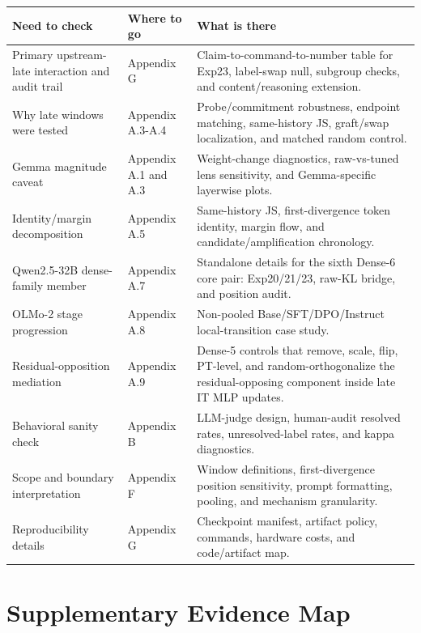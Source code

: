 \documentclass[11pt]{article}
\begin{document}
\begin{table}[t]
\centering
\small
\setlength{\tabcolsep}{3pt}
\begin{tabularx}{\linewidth}{@{}>{\raggedright\arraybackslash}X >{\raggedright\arraybackslash}X >{\raggedright\arraybackslash}X@{}}
\toprule
Need to check & Where to go & What is there \\
\midrule
Primary upstream-late interaction and audit trail & Appendix G & Claim-to-command-to-number table for Exp23, label-swap null, subgroup checks, and content/reasoning extension. \\
Why late windows were tested & Appendix A.3-A.4 & Probe/commitment robustness, endpoint matching, same-history JS, graft/swap localization, and matched random control. \\
Gemma magnitude caveat & Appendix A.1 and A.3 & Weight-change diagnostics, raw-vs-tuned lens sensitivity, and Gemma-specific layerwise plots. \\
Identity/margin decomposition & Appendix A.5 & Same-history JS, first-divergence token identity, margin flow, and candidate/amplification chronology. \\
Qwen2.5-32B dense-family member & Appendix A.7 & Standalone details for the sixth Dense-6 core pair: Exp20/21/23, raw-KL bridge, and position audit. \\
OLMo-2 stage progression & Appendix A.8 & Non-pooled Base/SFT/DPO/Instruct local-transition case study. \\
Residual-opposition mediation & Appendix A.9 & Dense-5 controls that remove, scale, flip, PT-level, and random-orthogonalize the residual-opposing component inside late IT MLP updates. \\
Behavioral sanity check & Appendix B & LLM-judge design, human-audit resolved rates, unresolved-label rates, and kappa diagnostics. \\
Scope and boundary interpretation & Appendix F & Window definitions, first-divergence position sensitivity, prompt formatting, pooling, and mechanism granularity. \\
Reproducibility details & Appendix G & Checkpoint manifest, artifact policy, commands, hardware costs, and code/artifact map. \\
\bottomrule
\end{tabularx}
\end{table}

\section{Supplementary Evidence Map}
\end{document}
